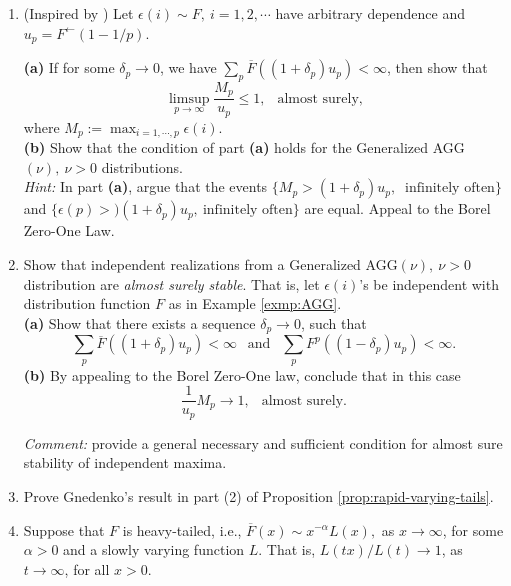 \begin{enumerate}

 \item (Inspired by \cite{resnick1973almost}) Let $\epsilon(i)\sim F,\ i=1,2,\cdots$ have arbitrary dependence 
 and $u_p = F^{\leftarrow}(1-1/p)$. 
 
 {\bf (a)}   If for some $\delta_p\to 0$,
 we have $\sum_{p} \overline{F}((1+\delta_p)u_p) <\infty$, then show that
 $$
 \limsup_{p\to\infty} \frac{M_p}{u_p} \le 1,\ \ \mbox{ almost surely,} 
 $$
 where $M_p:= \max_{i=1,\cdots,p} \epsilon(i)$.\\
 
 {\bf (b)} Show that the condition of part {\bf (a)} holds for the Generalized AGG$(\nu),\ \nu>0$ distributions.\\
 
 {\em Hint:} In part {\bf (a)}, argue that the events $\{ M_p > (1+\delta_p) u_p,\ \mbox{ infinitely often}\}$ and
  $\{\epsilon(p) > )(1+\delta_p)u_p, \ \mbox{infinitely often}\}$ are equal. Appeal to the Borel Zero-One Law.\\
 
 \item  Show that independent realizations from a Generalized AGG$(\nu),\ \nu>0$ distribution
  are {\em almost surely stable}. That is, let $\epsilon(i)$'s be independent with distribution function $F$ as in Example \ref{exmp:AGG}.\\

{\bf (a)} Show that there exists a sequence $\delta_p\to 0$, such that 
$$
\sum_p \overline F((1+\delta_p)u_p) <\infty\ \ \mbox{ and }\ \  \sum_p F^p((1-\delta_p)u_p) <\infty.
$$
 {\bf (b)} By appealing to the Borel Zero-One law, conclude that in this case
 $$
 \frac{1}{u_p} M_p {\longrightarrow} 1,\ \ \mbox{ almost surely}.
 $$

{\em Comment:} 
\cite{resnick1973almost} provide a general necessary and sufficient condition for almost sure stability of independent maxima.\\
 
 \item Prove Gnedenko's result in part (2) of Proposition \ref{prop:rapid-varying-tails}.\\
 
\item Suppose that $F$ is heavy-tailed, i.e., $\overline F(x) \sim x^{-\alpha} L(x),$ as $x\to\infty$, for some $\alpha>0$ and a
slowly varying function $L$.  That is, $L(tx)/L(t)\to 1$, as $t\to\infty$, for all $x>0$.\\


\end{enumerate}
